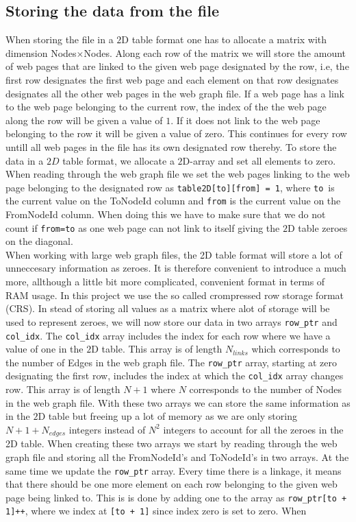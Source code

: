 \documentclass[onecolumn]{aastex62}
\begin{document}
\subsection{Storing the data from the file}
When storing the file in a $2$D table format one has to allocate a matrix with dimension Nodes$\times$Nodes. Along each row of the matrix we will store the amount of web pages that are linked to the given web page designated by the row, i.e, the first row designates the first web page and each element on that row designates designates all the other web pages in the web graph file. If a web page has a link to the web page belonging to the current row, the index of the the web page along the row will be given a value of $1$. If it does not link to the web page belonging to the row it will be given a value of zero. This continues for every row untill all web pages in the file has its own designated row thereby. To store the data in a $2D$ table format, we allocate a $2$D-array and set all elements to zero. When reading through the web graph file we set the web pages linking to the web page belonging to the designated row as \texttt{table2D[to][from] = 1}, where \texttt{to} is the current value on the ToNodeId column and \texttt{from} is the current value on the FromNodeId column. When doing this we have to make sure that we do not count if \texttt{from=to} as one web page can not link to itself giving the $2$D table zeroes on the diagonal.\\

When working with large web graph files, the 2D table format will store a lot of unneccesary information as zeroes. It is therefore convenient to introduce a much more, allthough a little bit more complicated, convenient format in terms of RAM usage. In this project we use the so called crompressed row storage format (CRS). In stead of storing all values as a matrix where alot of storage will be used to represent zeroes, we will now store our data in two arrays \texttt{row\_ptr} and \texttt{col\_idx}. The \texttt{col\_idx} array includes the index for each row where we have a value of one in the $2$D table. This array is of length $N_{links}$ which corresponds to the number of Edges in the web graph file. The \texttt{row\_ptr} array, starting at zero designating the first row, includes the index at which the \texttt{col\_idx} array changes row. This array is of length $N + 1$ where $N$ corresponds to the number of Nodes in the web graph file. With these two arrays we can store the same information as in the $2$D table but freeing up a lot of memory as we are only storing $N + 1 + N_{edges}$ integers instead of $N^2$ integers to account for all the zeroes in the 2D table. When creating these two arrays we start by reading through the web graph file and storing all the FromNodeId's and ToNodeId's in two arrays. At the same time  we update the \texttt{row\_ptr} array. Every time there is a linkage, it means that there should be one more element on each row belonging to the given web page being linked to.  This is is done by adding one to the array as \texttt{row\_ptr[to + 1]++}, where we index at \texttt{[to + 1]} since index zero is set to zero. When




\end{document}
